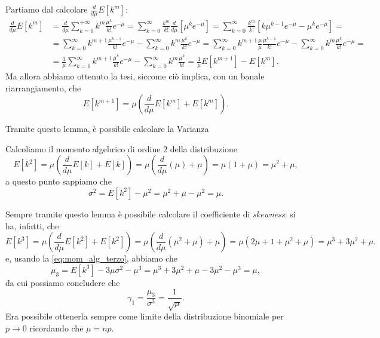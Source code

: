 \documentclass{report}
\begin{document}
\begin{myproof}
	Partiamo dal calcolare $\frac{d}{d\mu} E[k^m]$:
	\begin{align*}
		\frac{d}{d\mu} E[k^m] &= \frac{d}{d\mu} \sum_{k=0}^{+\infty} k^m \frac{\mu^k}{k!}e^{-\mu} = \sum_{k=0}^{\infty} \frac{k^m}{k!} \frac{d}{d\mu}[\mu^k e^{-\mu}] = \sum_{k=0}^{\infty} \frac{k^m}{k!}[k\mu^{k-1}e^{-\mu} - \mu^k e^{-\mu}] = \\
		&= \sum_{k=0}^{\infty} k^{m+1} \frac{\mu^{k-1}}{k!}e^{-\mu} - \sum_{k=0}^{\infty} k^m \frac{\mu^k}{k!}e^{-\mu} = \sum_{k=0}^{\infty} k^{m+1} \frac{\mu}{\mu} \frac{\mu^{k-1}}{k!}e^{-\mu} - \sum_{k=0}^{\infty} k^m \frac{\mu^k}{k!}e^{-\mu} = \\
		&= \frac{1}{\mu} \sum_{k=0}^{\infty} k^{m+1} \frac{\mu^k}{k!} e^{-\mu} - \sum_{k=0}^{\infty} k^m \frac{\mu^k}{k!} = \frac{1}{\mu} E[k^{m+1}] - E[k^m].
	\end{align*}
	Ma allora abbiamo ottenuto la tesi, siccome ciò implica, con un banale riarrangiamento, che
	$$
		E[k^{m+1}] = \mu \left( \frac{d}{d\mu} E[k^m] + E[k^m] \right).
	$$
\end{myproof}
Tramite questo lemma, è possibile calcolare la Varianza
\begin{myproof}
Calcoliamo il momento algebrico di ordine $2$ della distribuzione
$$
	E[k^2] = \mu(\frac{d}{d\mu}E[k] + E[k]) = \mu(\frac{d}{d\mu}(\mu) + \mu) = \mu(1 + \mu) = \mu^2 + \mu,
$$
a questo punto sappiamo che
$$
	\sigma^2 = E[k^2] - \mu^2 = \mu^2 + \mu - \mu^2 = \mu.
$$
\end{myproof}
Sempre tramite questo lemma è possibile calcolare il coefficiente di \emph{skewness}: si ha, infatti, che
$$
	E[k^3] = \mu(\frac{d}{d\mu}E[k^2] + E[k^2]) = \mu(\frac{d}{d\mu}(\mu^2 + \mu) + \mu) = \mu(2 \mu + 1 + \mu^2 + \mu) = \mu^3 + 3 \mu^2 + \mu.
$$
e, usando la \ref{eq:mom_alg_terzo}, abbiamo che
$$
\mu_3 = E[k^3] - 3\mu \sigma^2 - \mu^3 = \mu^3 + 3 \mu^2 + \mu - 3\mu^2 - \mu^3 = \mu,
$$
da cui possiamo concludere che
\begin{equation}
	\gamma_1 = \frac{\mu_3}{\sigma^3} = \frac{1}{\sqrt{\mu}}.
\end{equation}
Era possibile ottenerla sempre come limite della distribuzione binomiale per $p \to 0$ ricordando che $\mu = np$.
\end{document}
